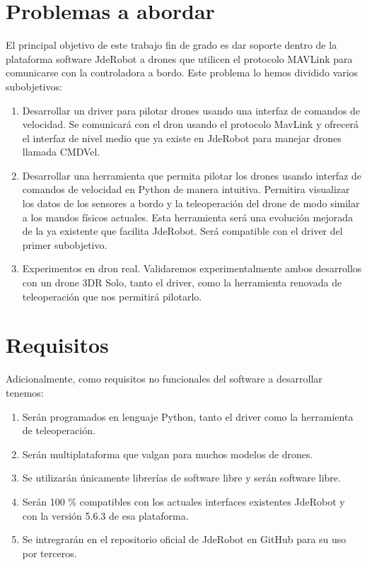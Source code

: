 \section{Problemas a abordar}

El principal objetivo de este trabajo fin de grado es dar soporte dentro de la plataforma software
JdeRobot a drones que utilicen el protocolo MAVLink para comunicarse con la controladora a bordo. Este problema lo hemos dividido varios subobjetivos:

\begin{enumerate}
\item Desarrollar un driver para pilotar drones usando una interfaz de comandos de velocidad. Se comunicará con el dron usando el protocolo MavLink y ofrecerá el interfaz de nivel medio que ya existe en JdeRobot para manejar drones llamada CMDVel.
\item Desarrollar una herramienta que permita pilotar los drones usando interfaz de comandos de velocidad en Python de manera intuitiva. Permitira visualizar los datos de los sensores a bordo y la teleoperación del drone de modo similar a los mandos físicos actuales. Esta herramienta será una evolución mejorada de la ya existente que facilita JdeRobot. Será compatible con el driver del primer subobjetivo.
\item Experimentos en dron real. Validaremos experimentalmente ambos desarrollos con un drone 3DR Solo, tanto el driver, como la herramienta renovada de teleoperación que nos permitirá pilotarlo.
\end{enumerate}


\section{Requisitos}

Adicionalmente, como requisitos no funcionales del software a desarrollar tenemos:

\begin{enumerate}
\item Serán programados en lenguaje Python, tanto el driver como la herramienta de teleoperación.
\item Serán multiplataforma que valgan para muchos modelos de drones.
\item Se utilizarán únicamente librerías de software libre y serán software libre.
\item Serán 100 \% compatibles con los actuales interfaces existentes JdeRobot y con la versión 5.6.3 de esa plataforma.
\item Se intregrarán en el repositorio oficial de JdeRobot en GitHub para su uso por terceros.

\end{enumerate}

